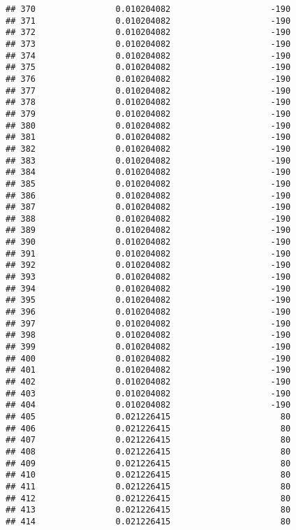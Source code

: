 \documentclass[]{article}
\begin{document}
\begin{verbatim}
## 370                0.010204082                    -190
## 371                0.010204082                    -190
## 372                0.010204082                    -190
## 373                0.010204082                    -190
## 374                0.010204082                    -190
## 375                0.010204082                    -190
## 376                0.010204082                    -190
## 377                0.010204082                    -190
## 378                0.010204082                    -190
## 379                0.010204082                    -190
## 380                0.010204082                    -190
## 381                0.010204082                    -190
## 382                0.010204082                    -190
## 383                0.010204082                    -190
## 384                0.010204082                    -190
## 385                0.010204082                    -190
## 386                0.010204082                    -190
## 387                0.010204082                    -190
## 388                0.010204082                    -190
## 389                0.010204082                    -190
## 390                0.010204082                    -190
## 391                0.010204082                    -190
## 392                0.010204082                    -190
## 393                0.010204082                    -190
## 394                0.010204082                    -190
## 395                0.010204082                    -190
## 396                0.010204082                    -190
## 397                0.010204082                    -190
## 398                0.010204082                    -190
## 399                0.010204082                    -190
## 400                0.010204082                    -190
## 401                0.010204082                    -190
## 402                0.010204082                    -190
## 403                0.010204082                    -190
## 404                0.010204082                    -190
## 405                0.021226415                      80
## 406                0.021226415                      80
## 407                0.021226415                      80
## 408                0.021226415                      80
## 409                0.021226415                      80
## 410                0.021226415                      80
## 411                0.021226415                      80
## 412                0.021226415                      80
## 413                0.021226415                      80
## 414                0.021226415                      80

\end{verbatim}
\end{document}
